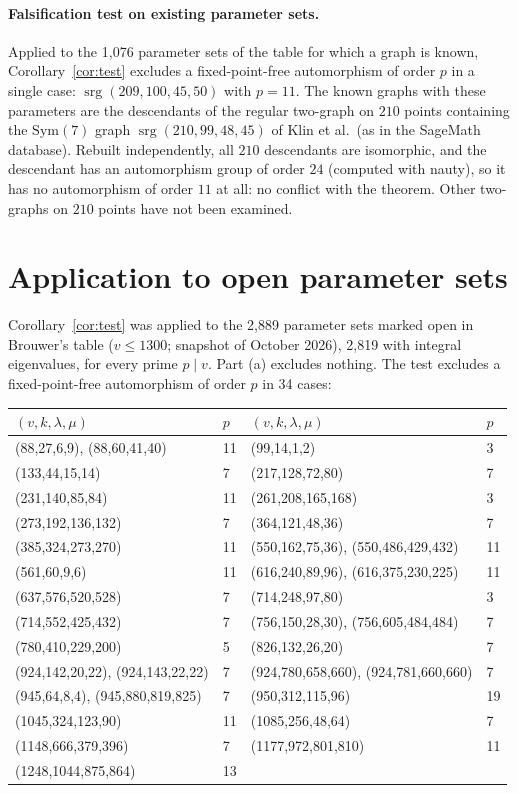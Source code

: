 \documentclass[11pt,a4paper]{article}
\theoremstyle{remark}
\newcommand{\srg}{\operatorname{srg}}
\begin{document}
\paragraph{Falsification test on existing parameter sets.} Applied to the 1{,}076 parameter sets of the table for which a graph is
known, Corollary~\ref{cor:test} excludes a fixed-point-free automorphism of order $p$ in a single case: $\srg(209,100,45,50)$ with
$p=11$. The known graphs with these parameters are the descendants of the regular two-graph on $210$ points containing the
$\mathrm{Sym}(7)$ graph $\srg(210,99,48,45)$ of Klin et al.\ (as in the SageMath database). Rebuilt independently, all $210$
descendants are isomorphic, and the descendant has an automorphism group of order $24$ (computed with nauty), so it has no
automorphism of order $11$ at all: no conflict with the theorem. Other two-graphs on $210$ points have not been examined.

\section{Application to open parameter sets}\label{sec:app}
Corollary~\ref{cor:test} was applied to the 2{,}889 parameter sets marked open in Brouwer's table ($v\le1300$; snapshot of
October 2026), 2{,}819 with integral eigenvalues, for every prime $p\mid v$. Part (a) excludes nothing. The test excludes a
fixed-point-free automorphism of order $p$ in 34 cases:

\begin{center}\small
\begin{tabular}{llll}
\toprule
$(v,k,\lambda,\mu)$ & $p$ & $(v,k,\lambda,\mu)$ & $p$\\
\midrule
(88,27,6,9), (88,60,41,40) & 11 & (99,14,1,2) & 3\\
(133,44,15,14) & 7 & (217,128,72,80) & 7\\
(231,140,85,84) & 11 & (261,208,165,168) & 3\\
(273,192,136,132) & 7 & (364,121,48,36) & 7\\
(385,324,273,270) & 11 & (550,162,75,36), (550,486,429,432) & 11\\
(561,60,9,6) & 11 & (616,240,89,96), (616,375,230,225) & 11\\
(637,576,520,528) & 7 & (714,248,97,80) & 3\\
(714,552,425,432) & 7 & (756,150,28,30), (756,605,484,484) & 7\\
(780,410,229,200) & 5 & (826,132,26,20) & 7\\
(924,142,20,22), (924,143,22,22) & 7 & (924,780,658,660), (924,781,660,660) & 7\\
(945,64,8,4), (945,880,819,825) & 7 & (950,312,115,96) & 19\\
(1045,324,123,90) & 11 & (1085,256,48,64) & 7\\
(1148,666,379,396) & 7 & (1177,972,801,810) & 11\\
(1248,1044,875,864) & 13 & & \\
\bottomrule
\end{tabular}
\end{center}
\end{document}
